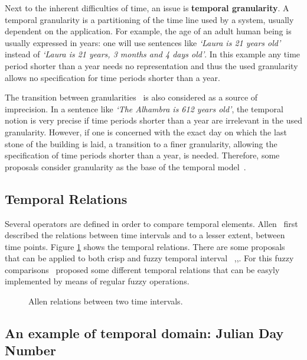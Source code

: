 Next to the inherent difficulties of time, an issue is \textbf{temporal granularity}. A temporal granularity is a partitioning of the time line used by a system, usually dependent on the application. For example, the age of an adult human being is usually expressed in years: one will use sentences like \emph{`Laura is 21 years old'} instead of \emph{`Laura is 21 years, 3 months and 4 days old'}. In this example any time period shorter than a year needs no representation and thus the used granularity allows no specification for time periods shorter than a year.

The transition between granularities~\cite{Lin97} is also considered as a source of imprecision. In a sentence like \emph{`The Alhambra is 612 years old'}, the temporal notion is very precise if time periods shorter than a year are irrelevant in the used granularity. However, if one is concerned with the exact day on which the last stone of the building is laid, a transition to a finer granularity, allowing the specification of time periods shorter than a year, is needed. Therefore, some proposals consider granularity as the base of the temporal model~\cite{Cru97}.

\subsection{Temporal Relations}


Several operators are defined in order to compare temporal elements. Allen~\cite{Allen83} first described the relations between time intervals and to a lesser extent, between time points. Figure \ref{fig:allen} shows the temporal relations. There are some proposals that can be applied to both crisp and fuzzy temporal interval ~\cite{ohlbach2004},\cite{nagypal2003},\cite{schockaert08}. For this fuzzy comparisons~\cite{garrido2009} proposed some different temporal relations that can be easyly implemented by means of regular fuzzy operations.

\begin{figure}
\centering

\caption{Allen relations between two time intervals.}
\label{fig:allen}
\end{figure}


\subsection{An example of temporal domain: Julian Day Number}

